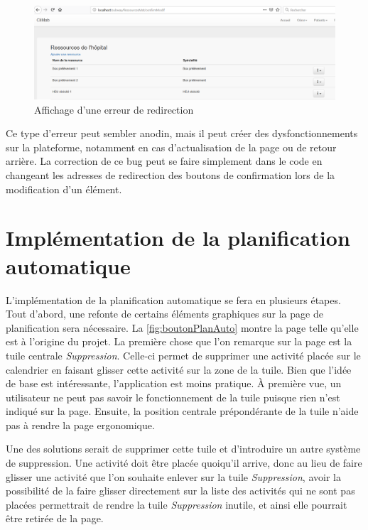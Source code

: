 \documentclass[noposter]{polytech/polytech}
\begin{document}
\begin{figure}
	\includegraphics[scale=0.45]{images/erreurURL}
	\caption{Affichage d'une erreur de redirection}
	\label{fig:erreurURL}
\end{figure}

Ce type d'erreur peut sembler anodin, mais il peut créer des dysfonctionnements sur la plateforme, notamment en cas d'actualisation de la page ou de retour arrière. La correction de ce bug peut se faire simplement dans le code en changeant les adresses de redirection des boutons de confirmation lors de la modification d'un élément. 


\section{Implémentation de la planification automatique}

L'implémentation de la planification automatique se fera en plusieurs étapes. Tout d'abord, une refonte de certains éléments graphiques sur la page de planification sera nécessaire. La \autoref{fig:boutonPlanAuto} montre la page telle qu'elle est à l'origine du projet. La première chose que l'on remarque sur la page est la tuile centrale \textit{Suppression}. Celle-ci permet de supprimer une activité placée sur le calendrier en faisant glisser cette activité sur la zone de la tuile. Bien que l'idée de base est intéressante, l'application est moins pratique. À première vue, un utilisateur ne peut pas savoir le fonctionnement de la tuile puisque rien n'est indiqué sur la page. Ensuite, la position centrale prépondérante de la tuile n'aide pas à rendre la page ergonomique. 

Une des solutions serait de supprimer cette tuile et d'introduire un autre système de suppression. Une activité doit être placée quoiqu'il arrive, donc au lieu de faire glisser une activité que l'on souhaite enlever sur la tuile \textit{Suppression}, avoir la possibilité de la faire glisser directement sur la liste des activités qui ne sont pas placées permettrait de rendre la tuile \textit{Suppression} inutile, et ainsi elle pourrait être retirée de la page. 
\end{document}
